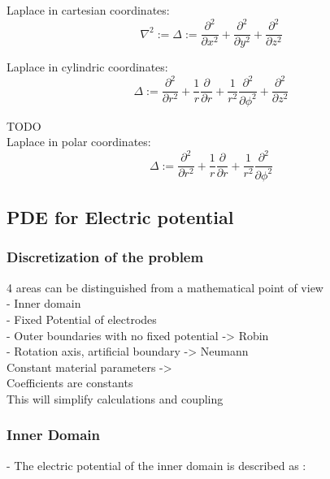 \documentclass[parskip=half, titlepage=yes, 12pt, BCOR=12mm, DIV=calc]{scrartcl}
\begin{document}
Laplace in cartesian coordinates:
\begin{equation}
    \nabla^2 := \Delta := \frac{\partial^2}{\partial x^2} + \frac{\partial^2}{\partial y^2} + \frac{\partial^2}{\partial z^2}
\end{equation}

Laplace in cylindric coordinates:
\begin{equation}
    \Delta := \frac{\partial^2}{\partial r^2} + \frac{1}{r} \frac{\partial}{\partial r} + \frac{1}{r^2} \frac{\partial^2}{\partial \phi^2} + \frac{\partial^2}{\partial z^2}
\end{equation}

TODO \\

Laplace in polar coordinates:
\begin{equation}
    \Delta := \frac{\partial^2}{\partial r^2} + \frac{1}{r} \frac{\partial}{\partial r} + \frac{1}{r^2} \frac{\partial^2}{\partial \phi^2}
\end{equation}



\subsection{PDE for Electric potential}

\subsubsection{Discretization of the problem}
4 areas can be distinguished from a mathematical point of view \\
- Inner domain \\
- Fixed Potential of electrodes \\
- Outer boundaries with no fixed potential -> Robin \\
- Rotation axis, artificial boundary -> Neumann \\

Constant material parameters -> \\
Coefficients are constants \\
This will simplify calculations and coupling \\

\subsubsection{Inner Domain}

- The electric potential of the inner domain is described as : 
\end{document}

